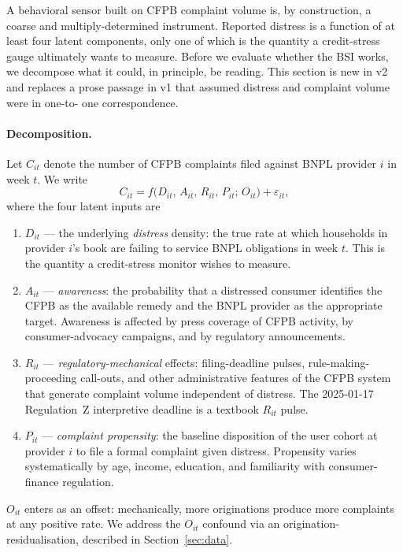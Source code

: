\documentclass[11pt,letterpaper]{article}
\newcommand{\bsi}{\text{BSI}}
\begin{document}
A behavioral sensor built on CFPB complaint volume is, by
construction, a coarse and multiply-determined instrument.
Reported distress is a function of at least four latent
components, only one of which is the quantity a credit-stress
gauge ultimately wants to measure. Before we evaluate whether the
$\bsi$ works, we decompose what it could, in principle, be
reading. This section is new in v2 and replaces a prose passage
in v1 that assumed distress and complaint volume were in one-to-
one correspondence.

\paragraph{Decomposition.} Let $C_{it}$ denote the number of
CFPB complaints filed against BNPL provider $i$ in week $t$. We
write
\[
  C_{it} = f\big(D_{it},\, A_{it},\, R_{it},\, P_{it};\,
  O_{it}\big) + \varepsilon_{it},
\]
where the four latent inputs are
\begin{enumerate}[leftmargin=*]
\item $D_{it}$ --- the underlying \emph{distress} density: the
      true rate at which households in provider $i$'s book are
      failing to service BNPL obligations in week $t$. This is
      the quantity a credit-stress monitor wishes to measure.
\item $A_{it}$ --- \emph{awareness}: the probability that a
      distressed consumer identifies the CFPB as the available
      remedy and the BNPL provider as the appropriate target.
      Awareness is affected by press coverage of CFPB activity,
      by consumer-advocacy campaigns, and by regulatory
      announcements.
\item $R_{it}$ --- \emph{regulatory-mechanical} effects:
      filing-deadline pulses, rule-making-proceeding call-outs,
      and other administrative features of the CFPB system that
      generate complaint volume independent of distress. The
      2025-01-17 Regulation~Z interpretive deadline is a textbook
      $R_{it}$ pulse.
\item $P_{it}$ --- \emph{complaint propensity}: the baseline
      disposition of the user cohort at provider $i$ to file a
      formal complaint given distress. Propensity varies
      systematically by age, income, education, and familiarity
      with consumer-finance regulation.
\end{enumerate}
$O_{it}$ enters as an offset: mechanically, more originations
produce more complaints at any positive rate. We address the
$O_{it}$ confound via an origination-residualisation, described
in Section~\ref{sec:data}.
\end{document}
